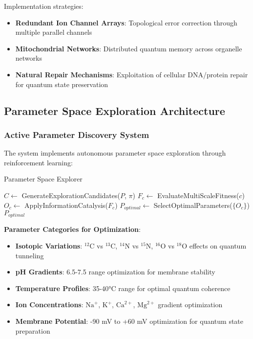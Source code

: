 \documentclass[11pt,a4paper]{article}
\begin{document}
Implementation strategies:
\begin{itemize}
\item \textbf{Redundant Ion Channel Arrays}: Topological error correction through multiple parallel channels
\item \textbf{Mitochondrial Networks}: Distributed quantum memory across organelle networks
\item \textbf{Natural Repair Mechanisms}: Exploitation of cellular DNA/protein repair for quantum state preservation
\end{itemize}

\subsection{Parameter Space Exploration Architecture}

\subsubsection{Active Parameter Discovery System}

The system implements autonomous parameter space exploration through reinforcement learning:

\begin{algorithm}
\caption{Parameter Space Explorer}
\begin{algorithmic}
    \State $C \leftarrow$ GenerateExplorationCandidates($P$, $\pi$)
        \State $F_c \leftarrow$ EvaluateMultiScaleFitness($c$)
        \State $O_c \leftarrow$ ApplyInformationCatalysis($F_c$)
    \EndFor
    \State $P_{optimal} \leftarrow$ SelectOptimalParameters($\{O_c\}$)
    \State \Return $P_{optimal}$
\EndProcedure
\end{algorithmic}
\end{algorithm}

\textbf{Parameter Categories for Optimization}:
\begin{itemize}
\item \textbf{Isotopic Variations}: $^{12}$C vs $^{13}$C, $^{14}$N vs $^{15}$N, $^{16}$O vs $^{18}$O effects on quantum tunneling
\item \textbf{pH Gradients}: 6.5-7.5 range optimization for membrane stability
\item \textbf{Temperature Profiles}: 35-40°C range for optimal quantum coherence
\item \textbf{Ion Concentrations}: $\text{Na}^+$, $\text{K}^+$, $\text{Ca}^{2+}$, $\text{Mg}^{2+}$ gradient optimization
\item \textbf{Membrane Potential}: -90 mV to +60 mV optimization for quantum state preparation
\end{itemize}
\end{document}
